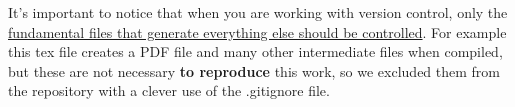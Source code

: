 It's important to notice that when you are working with version control, only the \underline{fundamental files that generate everything else should be controlled}. For example this tex file creates a PDF file and many other intermediate files when compiled, but these are not necessary \textbf{to reproduce} this work, so we excluded them from the repository with a clever use of the .gitignore file.
